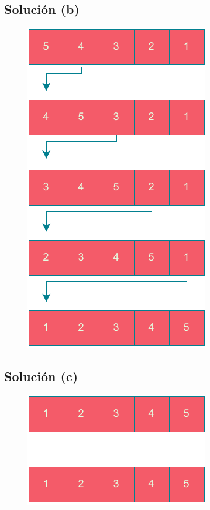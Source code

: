 \documentclass{article}
\begin{document}
\subsection{Solución (b)}
\begin{figure}[h]
    \centering
    \includegraphics[scale=0.6]{./estáticos/7b.pdf}
\end{figure}

\subsection{Solución (c)}
\begin{figure}[h]
    \centering
    \includegraphics[scale=0.6]{./estáticos/7c.pdf}
\end{figure}
\end{document}
